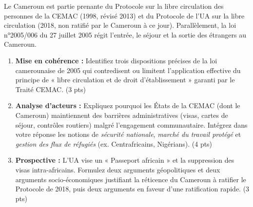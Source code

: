 \documentclass[11pt]{article}
\begin{document}
\begin{exercice}
\label{exo:reglement}
Le Cameroun est partie prenante du Protocole sur la libre circulation des personnes de la CEMAC (1998, révisé 2013) et du Protocole de l'UA sur la libre circulation (2018, non ratifié par le Cameroun à ce jour). Parallèlement, la loi n°2005/006 du 27 juillet 2005 régit l'entrée, le séjour et la sortie des étrangers au Cameroun.

\begin{enumerate}
    \item \textbf{Mise en cohérence :} Identifiez trois dispositions précises de la loi camerounaise de 2005 qui contredisent ou limitent l'application effective du principe de « libre circulation et de droit d'établissement » garanti par le Traité CEMAC. (3 pts)
    \item \textbf{Analyse d'acteurs :} Expliquez pourquoi les États de la CEMAC (dont le Cameroun) maintiennent des barrières administratives (visas, cartes de séjour, contrôles routiers) malgré l'engagement communautaire. Intégrez dans votre réponse les notions de \textit{sécurité nationale}, \textit{marché du travail protégé} et \textit{gestion des flux de réfugiés} (ex. Centrafricains, Nigérians). (4 pts)
    \item \textbf{Prospective :} L'UA vise un « Passeport africain » et la suppression des visas intra-africains. Formulez deux arguments géopolitiques et deux arguments socio-économiques justifiant la réticence du Cameroun à ratifier le Protocole de 2018, puis deux arguments en faveur d'une ratification rapide. (3 pts)
\end{enumerate}
\end{exercice}
\end{document}

